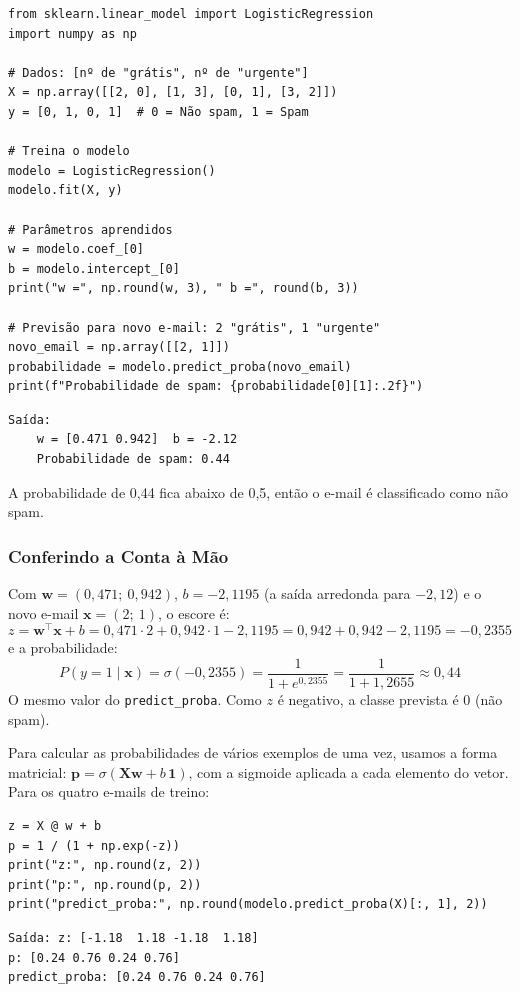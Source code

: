 \documentclass[a4paper,12pt,openany]{book}
\begin{document}
\begin{verbatim}
from sklearn.linear_model import LogisticRegression
import numpy as np

# Dados: [nº de "grátis", nº de "urgente"]
X = np.array([[2, 0], [1, 3], [0, 1], [3, 2]])
y = [0, 1, 0, 1]  # 0 = Não spam, 1 = Spam

# Treina o modelo
modelo = LogisticRegression()
modelo.fit(X, y)

# Parâmetros aprendidos
w = modelo.coef_[0]
b = modelo.intercept_[0]
print("w =", np.round(w, 3), " b =", round(b, 3))

# Previsão para novo e-mail: 2 "grátis", 1 "urgente"
novo_email = np.array([[2, 1]])
probabilidade = modelo.predict_proba(novo_email)
print(f"Probabilidade de spam: {probabilidade[0][1]:.2f}")
\end{verbatim}

\begin{verbatim}
Saída:
    w = [0.471 0.942]  b = -2.12
    Probabilidade de spam: 0.44
\end{verbatim}

A probabilidade de 0,44 fica abaixo de 0,5, então o e-mail é classificado como não spam.

\subsubsection{Conferindo a Conta à Mão}

Com \(\mathbf{w} = (0,471;\ 0,942)\), \(b = -2,1195\) (a saída arredonda para \(-2,12\)) e o novo e-mail \(\mathbf{x} = (2;\ 1)\), o escore é:
\[
z = \mathbf{w}^\top \mathbf{x} + b = 0,471 \cdot 2 + 0,942 \cdot 1 - 2,1195 = 0,942 + 0,942 - 2,1195 = -0,2355
\]
e a probabilidade:
\[
P(y = 1 \mid \mathbf{x}) = \sigma(-0,2355) = \frac{1}{1 + e^{0,2355}} = \frac{1}{1 + 1,2655} \approx 0,44
\]
O mesmo valor do \texttt{predict\_proba}. Como \(z\) é negativo, a classe prevista é 0 (não spam).

Para calcular as probabilidades de vários exemplos de uma vez, usamos a forma matricial: \(\mathbf{p} = \sigma(\mathbf{X}\mathbf{w} + b\,\mathbf{1})\), com a sigmoide aplicada a cada elemento do vetor. Para os quatro e-mails de treino:

\begin{verbatim}
z = X @ w + b
p = 1 / (1 + np.exp(-z))
print("z:", np.round(z, 2))
print("p:", np.round(p, 2))
print("predict_proba:", np.round(modelo.predict_proba(X)[:, 1], 2))
\end{verbatim}
\begin{verbatim}
Saída: z: [-1.18  1.18 -1.18  1.18]
p: [0.24 0.76 0.24 0.76]
predict_proba: [0.24 0.76 0.24 0.76]
\end{verbatim}
\end{document}
